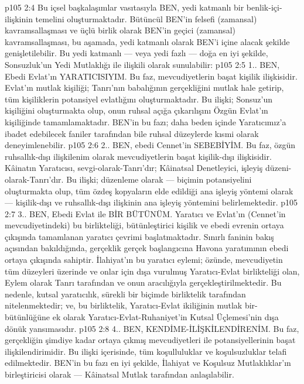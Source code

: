 \vs p105 2:4 Bu içsel başkalaşımlar vasıtasıyla BEN, yedi katmanlı bir benlik\hyp{}içi\hyp{}ilişkinin temelini oluşturmaktadır. Bütüncül BEN’in felsefi (zamansal) kavramsallaşması ve üçlü birlik olarak BEN’in geçici (zamansal) kavramsallaşması, bu aşamada, yedi katmanlı olarak BEN’i içine alacak şekilde genişletilebilir. Bu yedi katmanlı --- veya yedi fazlı --- doğa en iyi şekilde, Sonsuzluk’un Yedi Mutlaklığı ile ilişkili olarak sunulabilir:
\vs p105 2:5 1.. BEN, Ebedi Evlat’ın YARATICISIYIM. Bu faz, mevcudiyetlerin başat kişilik ilişkisidir. Evlat’ın mutlak kişiliği; Tanrı’nın babalığının gerçekliğini mutlak hale getirip, tüm kişiliklerin potansiyel evlatlığını oluşturmaktadır. Bu ilişki; Sonsuz’un kişiliğini oluşturmakta olup, onun ruhsal açığa çıkarılışını Özgün Evlat’ın kişiliğinde tamamlamaktadır. BEN’in bu fazı; daha beden içinde Yaratıcımız’a ibadet edebilecek faniler tarafından bile ruhsal düzeylerde kısmi olarak deneyimlenebilir.
\vs p105 2:6 2.\bibnobreakspace {}. BEN, ebedi Cennet’in SEBEBİYİM. Bu faz, özgün ruhsallık\hyp{}dışı ilişkilenim olarak mevcudiyetlerin başat kişilik\hyp{}dışı ilişkisidir. Kâinatın Yaratıcısı, sevgi\hyp{}olarak\hyp{}Tanrı’dır; Kâinatsal Denetleyici, işleyiş düzeni\hyp{}olarak\hyp{}Tanrı’dır. Bu ilişki; düzenleme olarak --- biçimin potansiyelini oluşturmakta olup, tüm özdeş kopyaların elde edildiği ana işleyiş yöntemi olarak --- kişilik\hyp{}dışı ve ruhsallık\hyp{}dışı ilişkinin ana işleyiş yöntemini belirlemektedir.
\vs p105 2:7 3.. BEN, Ebedi Evlat ile BİR BÜTÜNÜM. Yaratıcı ve Evlat’ın (Cennet’in mevcudiyetindeki) bu birlikteliği, bütünleştirici kişilik ve ebedi evrenin ortaya çıkışında tamamlanan yaratıcı çevrimi başlatmaktadır. Sınırlı faninin bakış açısından bakıldığında, gerçeklik gerçek başlangıcına Havona yaratımının ebedi ortaya çıkışında sahiptir. İlahiyat’ın bu yaratıcı eylemi; özünde, mevcudiyetin tüm düzeyleri üzerinde ve onlar için dışa vurulmuş Yaratıcı\hyp{}Evlat birlikteliği olan, Eylem olarak Tanrı tarafından ve onun aracılığıyla gerçekleştirilmektedir. Bu nedenle, kutsal yaratıcılık, sürekli bir biçimde birliktelik tarafından nitelenmektedir; ve, bu birliktelik, Yaratıcı\hyp{}Evlat ikiliğinin mutlak bir\hyp{}bütünlüğüne ek olarak Yaratıcı\hyp{}Evlat\hyp{}Ruhaniyet’in Kutsal Üçlemesi’nin dışa dönük yansımasıdır.
\vs p105 2:8 4.\bibnobreakspace {}. BEN, KENDİME\hyp{}İLİŞKİLENDİRENİM. Bu faz, gerçekliğin şimdiye kadar ortaya çıkmış mevcudiyetleri ile potansiyellerinin başat ilişkilendirimidir. Bu ilişki içerisinde, tüm koşulluluklar ve koşulsuzluklar telafi edilmektedir. BEN’in bu fazı en iyi şekilde, İlahiyat ve Koşulsuz Mutlaklıklar’ın birleştiricisi olarak --- Kâinatsal Mutlak tarafından anlaşılabilir.
